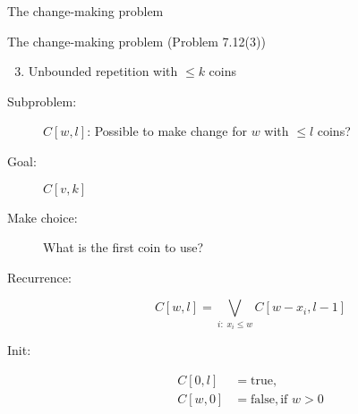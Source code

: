 \begin{frame}{The change-making problem}
  \begin{exampleblock}{The change-making problem (Problem 7.12(3))}
	\begin{enumerate}[(1)]
	  \setcounter{enumi}{2}
	  \item Unbounded repetition with $\le k$ coins
	\end{enumerate}
  \end{exampleblock}

  \pause
  \begin{description}
	\item[Subproblem:] $C[w,l]$: Possible to make change for $w$ with $\le l$ coins?
	\item[Goal:] $C[v,k]$
	  \pause
	\item[Make choice:] What is the first coin to use?
	\item[Recurrence:] 
	  \[
		C[w,l] = \bigvee_{i: \; x_i \le w} C[w-x_i, l-1]
	  \]
	  \pause
	\item[Init:]
	  \begin{align*}
		C[0,l] &= \text{true}, \\
		C[w,0] &= \text{false}, \text{if } w > 0
	  \end{align*}
  \end{description}
\end{frame}
